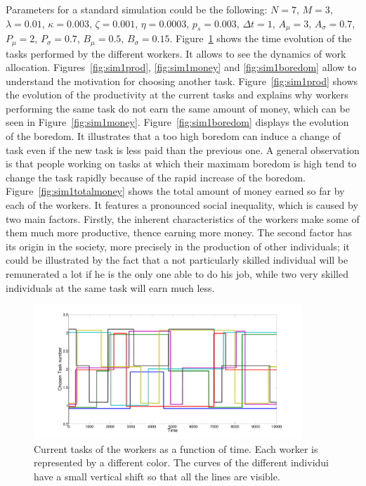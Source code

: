 Parameters for a standard simulation could be the following: $N=7$, $M=3$, $\lambda=0.01$, $\kappa=0.003$, $\zeta=0.001$, $\eta=0.0003$, $p_s=0.003$, $\Delta t=1$, $A_\mu=3$, $A_\sigma=0.7$, $P_\mu=2$, $P_\sigma=0.7$, $B_\mu=0.5$, $B_\sigma=0.15$. Figure~\ref{fig:sim1task} shows the time evolution of the tasks performed by the different workers. It allows to see the dynamics of work allocation. Figures~\ref{fig:sim1prod}, \ref{fig:sim1money} and \ref{fig:sim1boredom} allow to understand the motivation for choosing another task. Figure~\ref{fig:sim1prod} shows the evolution of the productivity at the current tasks and explains why workers performing the same task do not earn the same amount of money, which can be seen in Figure~\ref{fig:sim1money}. Figure~\ref{fig:sim1boredom} displays the evolution of the boredom. It illustrates that a too high boredom can induce a change of task even if the new task is less paid than the previous one. A general observation is that people working on tasks at which their maximam boredom is high tend to change the task rapidly because of the rapid increase of the boredom. Figure~\ref{fig:sim1totalmoney} shows the total amount of money earned so far by each of the workers. It features a pronounced social inequality, which is caused by two main factors. Firstly, the inherent characteristics of the workers make some of them much more productive, thence earning more money. The second factor has its origin in the society, more precisely in the production of other individuals; it could be illustrated by the fact that a not particularly skilled individual will be remunerated a lot if he is the only one able to do his job, while two very skilled individuals at the same task will earn much less.

\begin{figure}[hp!]
	\centering
	\includegraphics[width=0.9\textwidth]{../figures/taskno.pdf}
	\caption{Current tasks of the workers as a function of time. Each worker is represented by a different color. The curves of the different individui have a small vertical shift so that all the lines are visible.}
	\label{fig:sim1task}
\end{figure}

